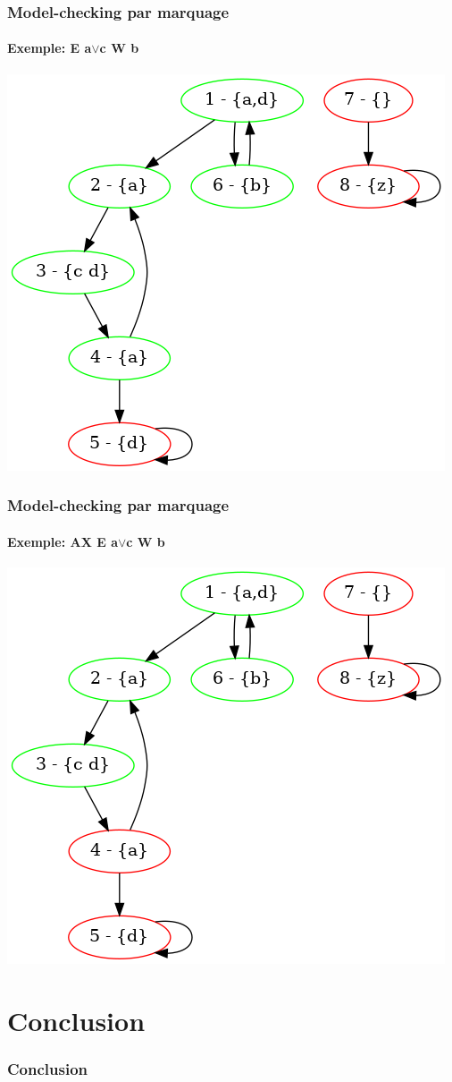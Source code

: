 \documentclass[11pt]{beamer}
\begin{document}
\begin{frame}
    \frametitle{Model-checking par marquage}
    \framesubtitle{Exemple: E a$\lor$c W b}

	\begin{center}
	\includegraphics[scale=0.4]{imgs/marquage3.png}
\end{center}
\end{frame}

\begin{frame}
    \frametitle{Model-checking par marquage}
    \framesubtitle{Exemple: AX E a$\lor$c W b}

	\begin{center}
	\includegraphics[scale=0.4]{imgs/marquage4.png}
\end{center}
\end{frame}

\section*{Conclusion}
\begin{frame}
    \frametitle{Conclusion}
\end{frame}
\end{document}
